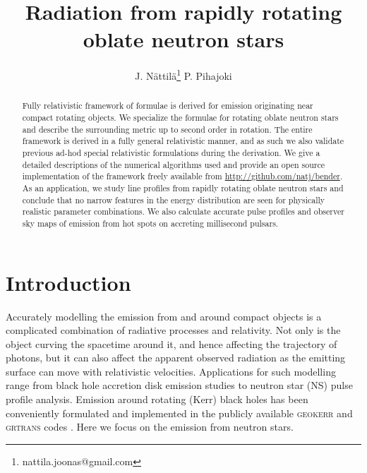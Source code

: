 \documentclass[iop, usenatbib]{emulateapj}
\begin{document}
\title{Radiation from rapidly rotating oblate neutron stars}

\author{J. N\"attil\"a\thanks{nattila.joonas@gmail.com}
  P. Pihajoki}

\affil{}


\begin{abstract}
Fully relativistic framework of formulae is derived for emission originating near compact rotating objects.
We specialize the formulae for rotating oblate neutron stars and describe the surrounding metric up to second order in rotation.
The entire framework is derived in a fully general relativistic manner, and as such we also validate previous ad-hod special relativistic formulations during the derivation.
We give a detailed descriptions of the numerical algorithms used and provide an open source implementation of the framework freely available from \url{http://github.com/natj/bender}.
As an application, we study line profiles from rapidly rotating oblate neutron stars and conclude that no narrow features in the energy distribution are seen for physically realistic parameter combinations.
We also calculate accurate pulse profiles and observer sky maps of emission from hot spots on accreting millisecond pulsars.
\end{abstract}

\section{Introduction}
Accurately modelling the emission from and around compact objects is a complicated combination of radiative processes and relativity.
Not only is the object curving the spacetime around it, and hence affecting the trajectory of photons, but it can also affect the apparent observed radiation as the emitting surface can move with relativistic velocities.
Applications for such modelling range from black hole accretion disk emission studies to neutron star (NS) pulse profile analysis.
Emission around rotating (Kerr) black holes has been conveniently formulated and implemented in the publicly available \textsc{geokerr} and \textsc{grtrans} codes \citep{dexter2009, dexter2016}.
Here we focus on the emission from neutron stars.
\end{document}
